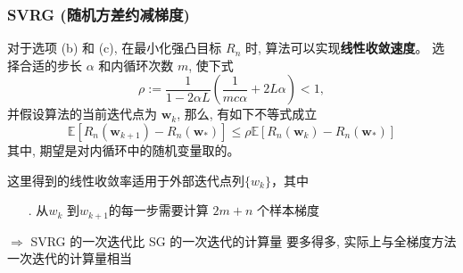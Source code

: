 \documentclass[handout]{beamer}
\begin{document}
\begin{frame}
\begin{center}
\end{center}
\end{frame}

\begin{frame}
\frametitle{SVRG (随机方差约减梯度)}


对于选项 (b) 和 (c), 在最小化强凸目标 $R_n$ 时, 算法可以实现\textbf{线性收敛速度}。
选择合适的步长 $\alpha$ 和内循环次数 $m$, 使下式
$$
\rho:=\frac{1}{1-2 \alpha L}\left(\frac{1}{m c \alpha}+2 L \alpha\right)<1,
$$
并假设算法的当前迭代点为 $\boldsymbol{w}_k$, 那么, 有如下不等式成立
$$
\mathbb{E}\left[R_n\left(\boldsymbol{w}_{k+1}\right)-R_n\left(\boldsymbol{w}_*\right)\right] \leqslant \rho \mathbb{E}\left[R_n\left(\boldsymbol{w}_k\right)-R_n\left(\boldsymbol{w}_*\right)\right]
$$
其中, 期望是对内循环中的随机变量取的。

\bigskip

\begin{footnoteremark}
这里得到的线性收敛率适用于外部迭代点列$\{w_k\}$，其中
\begin{itemize}
  \item[.] 从$w_k$ 到$w_{k+1}$的每一步需要计算 $2m + n$ 个样本梯度
\end{itemize}
$\Rightarrow$  SVRG 的一次迭代比 SG 的一次迭代的计算量 要多得多, 实际上与全梯度方法一次迭代的计算量相当

\end{footnoteremark}

\end{frame}
\end{document}
